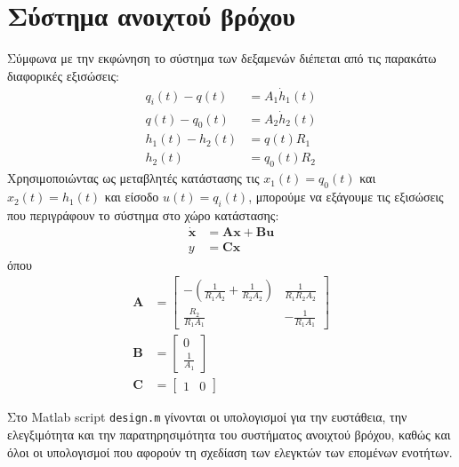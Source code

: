 \documentclass[a4paper, 11pt, english, greek]{article}
\begin{document}
\section{Σύστημα ανοιχτού βρόχου}
Σύμφωνα με την εκφώνηση το σύστημα των δεξαμενών διέπεται από τις παρακάτω διαφορικές εξισώσεις:
\begin{equation}
  \begin{split}
  	\label{eq:dif}
	q_i(t)-q(t) &= A_1 \dot{h}_1(t)\\
	q(t)-q_0(t) &= A_2 \dot{h}_2(t)\\
	h_1(t) - h_2(t) &= q(t) R_1\\
	h_2(t) &= q_0(t) R_2
  \end{split}
\end{equation}
Χρησιμοποιώντας ως μεταβλητές κατάστασης τις $x_1(t)=q_0(t)$ και $x_2(t)=h_1(t)$ και είσοδο $u(t) = q_i(t)$,
μπορούμε να εξάγουμε τις εξισώσεις που περιγράφουν το σύστημα στο χώρο κατάστασης:
\begin{equation}
  \begin{split}
  	\label{eq:ss}
  	\dot{\mathbf{x}} &= \mathbf{A}\mathbf{x} + \mathbf{B}\mathbf{u}\\
    y &= \mathbf{C}\mathbf{x}
  \end{split}
\end{equation}
όπου
\begin{equation}
  \label{eq:mat}
  \begin{split}
    \mathbf{A} &=
  	\begin{bmatrix}
      -(\frac{\displaystyle 1}{\displaystyle R_1 A_2} + \frac{\displaystyle 1}{\displaystyle R_2 A_2}) &
      \frac{\displaystyle 1}{\displaystyle R_1 R_2 A_2} \\
      \frac{\displaystyle R_2}{\displaystyle R_1 A_1} &
      -\frac{\displaystyle 1}{\displaystyle R_1 A_1}
    \end{bmatrix}\\
    \mathbf{B} &=
    \begin{bmatrix}
      0\\
      \frac{\displaystyle 1}{\displaystyle A_1}
    \end{bmatrix}\\
    \mathbf{C} &=
    \begin{bmatrix}
      1 & 0
    \end{bmatrix}
  \end{split}
\end{equation}

Στο \textlatin{Matlab script} \textlatin{\texttt{design.m}} γίνονται οι υπολογισμοί για την ευστάθεια,
την ελεγξιμότητα και την παρατηρησιμότητα του συστήματος ανοιχτού βρόχου, καθώς και όλοι οι υπολογισμοί
που αφορούν τη σχεδίαση των ελεγκτών των επομένων ενοτήτων.
\end{document}
